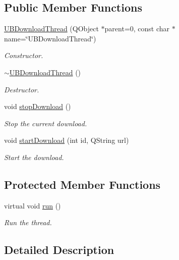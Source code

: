 \subsection*{Public Member Functions}
\begin{DoxyCompactItemize}
\item 
\hyperlink{class_u_b_download_thread_a425246490b579d306692543cb8c12d9e}{U\-B\-Download\-Thread} (Q\-Object $\ast$parent=0, const char $\ast$name=\char`\"{}U\-B\-Download\-Thread\char`\"{})
\begin{DoxyCompactList}\small\item\em Constructor. \end{DoxyCompactList}\item 
\hyperlink{class_u_b_download_thread_a3aed7562c30d6c59a51fabe40d33ac91}{$\sim$\-U\-B\-Download\-Thread} ()
\begin{DoxyCompactList}\small\item\em Destructor. \end{DoxyCompactList}\item 
void \hyperlink{class_u_b_download_thread_a8fcafc9a1f3c62d2b62e93d1985ce905}{stop\-Download} ()
\begin{DoxyCompactList}\small\item\em Stop the current download. \end{DoxyCompactList}\item 
void \hyperlink{class_u_b_download_thread_a7b70731f9504cf7cbb9cdf7fc7410577}{start\-Download} (int id, Q\-String url)
\begin{DoxyCompactList}\small\item\em Start the download. \end{DoxyCompactList}\end{DoxyCompactItemize}
\subsection*{Protected Member Functions}
\begin{DoxyCompactItemize}
\item 
virtual void \hyperlink{class_u_b_download_thread_a271efdb9cf3c72c44f929d70c0cf3181}{run} ()
\begin{DoxyCompactList}\small\item\em Run the thread. \end{DoxyCompactList}\end{DoxyCompactItemize}


\subsection{Detailed Description}



